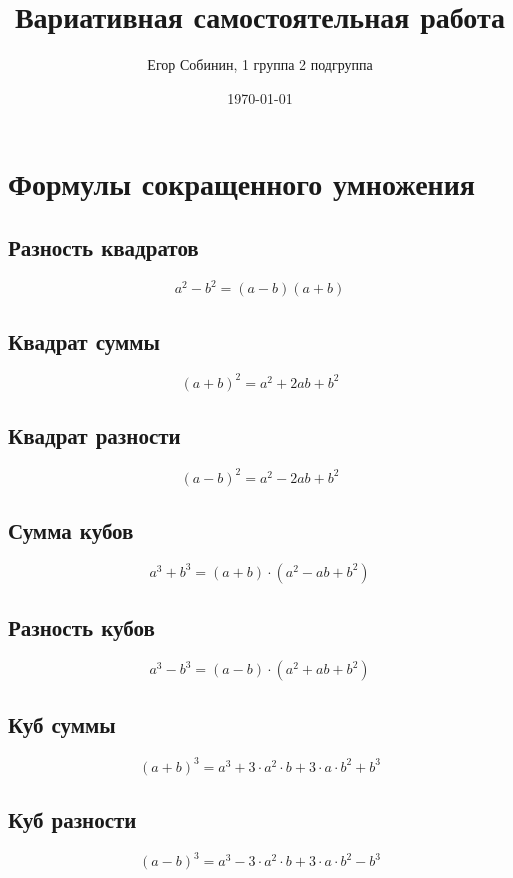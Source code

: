 \documentclass[a4paper,12pt]{article} %
\author{Егор Собинин, 1 группа 2 подгруппа}
\title{Вариативная самостоятельная работа}
\date{\today}
\begin{document}
\maketitle
\newpage
\section{Формулы сокращенного умножения}
\subsection{Разность квадратов}

$$a^2 - b^2 = (a-b)(a+b)$$

\subsection{Квадрат суммы}

$$(a+b)^2 = a^2 + 2ab + b^2$$

\subsection{Квадрат разности}

$$(a-b)^2 = a^2 - 2ab + b^2$$

\subsection{Сумма кубов}

$$a^3+b^3 = (a+b)\cdot(a^2-ab+b^2)$$

\subsection{Разность кубов}

$$a^3-b^3=(a-b)\cdot(a^2+ab+b^2)$$

\subsection{Куб суммы}

$$(a+b)^3=a^3+3\cdot a^2\cdot b + 3 \cdot a \cdot b^2 + b^3$$

\subsection{Куб разности}

$$(a-b)^3=a^3-3\cdot a^2\cdot b + 3 \cdot a \cdot b^2 - b^3$$
\end{document}
